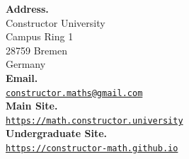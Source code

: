\begin{minipage}[t]{0.47\textwidth}
  \vspace{\external}


  \vspace{\internal}
  \textbf{Address.}\\
  Constructor University \\
  Campus Ring 1\\
  28759 Bremen\\
  Germany\\[0.2cm]
  \textbf{Email.}\\
  \href{mailto:constructor.maths@gmail.com}{
    \texttt{constructor.maths@gmail.com}
    }\\[0.2cm]
  \textbf{Main Site.}\\
  \href{https://math.constructor.university/}{
    \texttt{https://math.constructor.university}
  }\\[0.2cm]
  \textbf{Undergraduate Site.}\\
  \href{https://constructor-math.github.io/Home Page/landing.html}{
    \texttt{https://constructor-math.github.io}
    }\\
  
  \vspace{-0.5cm}

  \smjgoldline{1.2pt}


\end{minipage}

\vspace{0.1cm}

\smjgoldline{1.2pt}